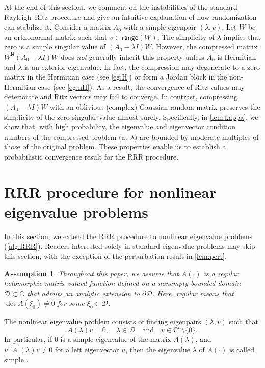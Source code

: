 \documentclass[a4paper,11pt]{article}
\newtheorem{assumption}{Assumption}
\newcommand{\Htran}{\mathsf{H}}
\newcommand{\C}{\mathbb{C}}
\newcommand{\region}{\mathcal{D}}
\newcommand{\range}{\mathsf{range}}
\begin{document}
At the end of this section, we comment on the instabilities of the standard Rayleigh--Ritz procedure and give an intuitive explanation of how randomization can stabilize it.
Consider a matrix $A_{0}$ with a simple eigenpair $(\lambda,v)$. Let $W$ be an orthonormal matrix such that $v\in\range(W)$.
The simplicity of $\lambda$ implies that zero is a simple singular value of $(A_{0}-\lambda I)W$.
However, the compressed matrix $W^{\Htran}(A_{0}-\lambda I)W$ does \emph{not} generally inherit this property unless $A_{0}$ is Hermitian and $\lambda$ is an exterior eigenvalue.
In fact, the compression may degenerate to a zero matrix in the Hermitian case (see \cref{eg:H}) or form a Jordan block in the non-Hermitian case (see \cref{eg:nH}).
As a result, the convergence of Ritz values may deteriorate and Ritz vectors may fail to converge.
In contrast, compressing $(A_{0}-\lambda I)W$ with an oblivious (complex) Gaussian random matrix preserves the simplicity of the zero singular value almost surely.
Specifically, in \cref{lem:kappa}, we show that, with high probability, the eigenvalue and eigenvector condition numbers of the compressed problem (at $\lambda$) are bounded by moderate multiples of those of the original problem.
These properties enable us to establish a probabilistic convergence result for the RRR procedure.




\section{RRR procedure for nonlinear eigenvalue problems}
\label{sec:algo}
In this section, we extend the RRR procedure to nonlinear eigenvalue problems (\cref{alg:RRR}).
Readers interested solely in standard eigenvalue problems may skip this section, with the exception of the perturbation result in \cref{lem:pert}.


\begin{assumption}
    \label{asp:A}
    Throughout this paper, we assume that $A(\cdot)$ is a regular holomorphic matrix-valued function defined on a nonempty bounded domain $\region\subset\C$ that admits an analytic extension to $\partial\region$.
    Here, regular means that $\det A(\xi_{0})\neq 0$ for some $\xi_{0}\in\region$.
\end{assumption}

The nonlinear eigenvalue problem \cite{Guttel2017} consists of finding eigenpairs $(\lambda,v)$ such that
\begin{equation*}
    A(\lambda) v = 0,\quad \lambda\in\region\quad\text{and}\quad v\in\C^{n}\setminus\{0\}.
\end{equation*}
In particular, if $0$ is a simple eigenvalue of the matrix $A(\lambda)$, and $u^{\Htran}A^{\prime}(\lambda)v\neq 0$ for a left eigenvector $u$, then the eigenvalue $\lambda$ of $A(\cdot)$ is called simple \cite[Prop.~1]{Neumaier1985}.
\end{document}

